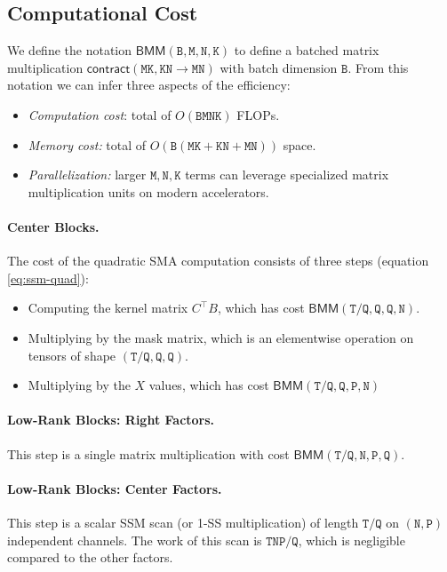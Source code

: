 \documentclass{article}
\begin{document}
\subsection{Computational Cost}

We define the notation $\mathsf{BMM}(\mathtt{B}, \mathtt{M}, \mathtt{N}, \mathtt{K})$ to define a batched matrix multiplication $\mathsf{contract}(\mathtt{\mathtt{MK},\mathtt{KN} \to \mathtt{MN}})$ with batch dimension $\mathtt{B}$.
From this notation we can infer three aspects of the efficiency:
\begin{itemize}
  \item \emph{Computation cost}: total of $O(\mathtt{BMNK})$ FLOPs.
  \item \emph{Memory cost:} total of $O(\mathtt{B}(\mathtt{MK}+\mathtt{KN}+\mathtt{MN}))$ space.
  \item \emph{Parallelization:} larger $\mathtt{M}, \mathtt{N}, \mathtt{K}$ terms can leverage specialized matrix multiplication units on modern accelerators.
\end{itemize}

\paragraph{Center Blocks.}
The cost of the quadratic SMA computation consists of three steps (equation \eqref{eq:ssm-quad}):
\begin{itemize}
  \item Computing the kernel matrix $C^{\top} B$, which has cost $\mathsf{BMM}(\mathtt{T}/\mathtt{Q}, \mathtt{Q}, \mathtt{Q}, \mathtt{N})$.
  \item Multiplying by the mask matrix, which is an elementwise operation on tensors of shape $(\mathtt{T}/\mathtt{Q}, \mathtt{Q}, \mathtt{Q})$.
  \item Multiplying by the $X$ values, which has cost $\mathsf{BMM}(\mathtt{T}/\mathtt{Q}, \mathtt{Q}, \mathtt{P}, \mathtt{N})$
\end{itemize}

\paragraph{Low-Rank Blocks: Right Factors.}
This step is a single matrix multiplication with cost $\mathsf{BMM}(\mathtt{T}/\mathtt{Q}, \mathtt{N}, \mathtt{P}, \mathtt{Q})$.

\paragraph{Low-Rank Blocks: Center Factors.}
This step is a scalar SSM scan (or 1-SS multiplication) of length $\mathtt{T}/\mathtt{Q}$ on $(\mathtt{N}, \mathtt{P})$ independent channels.
The work of this scan is $\mathtt{TNP}/\mathtt{Q}$, which is negligible compared to the other factors.
\end{document}
